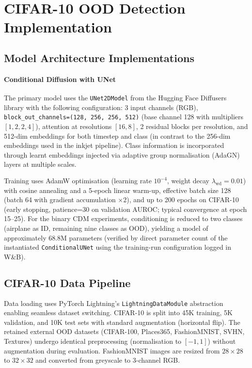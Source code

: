 
\section{CIFAR-10 OOD Detection Implementation}
\label{sec:impl:cifar10_ood}

\subsection{Model Architecture Implementations}
\label{sec:impl:cifar10_model}

\paragraph{Conditional Diffusion with UNet}

The primary model uses the \texttt{UNet2DModel} from the Hugging Face Diffusers library with the following configuration: 3 input channels (RGB), \texttt{block\_out\_channels=(128, 256, 256, 512)} (base channel 128 with multipliers $[1, 2, 2, 4]$), attention at resolutions $[16, 8]$, 2 residual blocks per resolution, and 512-dim embeddings for both timestep and class (in contrast to the 256-dim embeddings used in the inkjet pipeline). Class information is incorporated through learnt embeddings injected via adaptive group normalisation (AdaGN) layers at multiple scales.

Training uses AdamW optimisation (learning rate $10^{-4}$, weight decay $\lambda_{\text{wd}} = 0.01$) with cosine annealing and a 5-epoch linear warm-up, effective batch size 128 (batch 64 with gradient accumulation $\times 2$), and up to 200 epochs on CIFAR-10 (early stopping, patience=30 on validation AUROC; typical convergence at epoch 15--25). For the binary CDM experiments, conditioning is reduced to two classes (airplane as ID, remaining nine classes as OOD), yielding a model of approximately 68.8M parameters (verified by direct parameter count of the instantiated \texttt{ConditionalUNet} using the training-run configuration logged in W\&B).

\subsection{CIFAR-10 Data Pipeline}
\label{sec:impl:cifar10_data}

Data loading uses PyTorch Lightning's \texttt{LightningDataModule} abstraction enabling seamless dataset switching. CIFAR-10 is split into 45K training, 5K validation, and 10K test sets with standard augmentation (horizontal flip). The retained external OOD datasets (CIFAR-100, Places365, FashionMNIST, SVHN, Textures) undergo identical preprocessing (normalisation to $[-1, 1]$) without augmentation during evaluation. FashionMNIST images are resized from $28 \times 28$ to $32 \times 32$ and converted from greyscale to 3-channel RGB.

